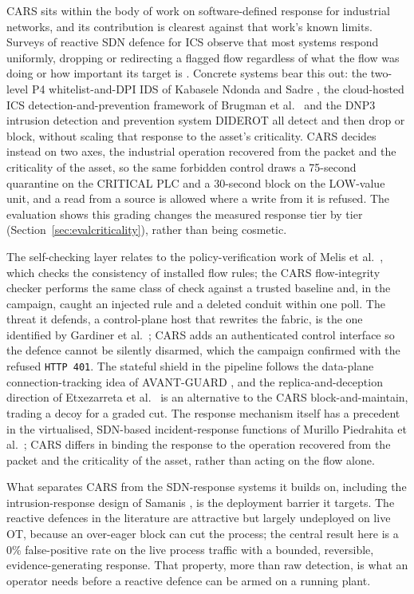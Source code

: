 CARS sits within the body of work on software-defined response for industrial networks, and its contribution is clearest against that work's known limits. Surveys of reactive SDN defence for ICS observe that most systems respond uniformly, dropping or redirecting a flagged flow regardless of what the flow was doing or how important its target is \cite{etxezarreta2023survey}. Concrete systems bear this out: the two-level P4 whitelist-and-DPI IDS of Kabasele Ndonda and Sadre \cite{kabasele2018twolevel}, the cloud-hosted ICS detection-and-prevention framework of Brugman et al.\ \cite{brugman2019cloud} and the DNP3 intrusion detection and prevention system DIDEROT \cite{radoglou2020diderot} all detect and then drop or block, without scaling that response to the asset's criticality. CARS decides instead on two axes, the industrial operation recovered from the packet and the criticality of the asset, so the same forbidden control draws a 75-second quarantine on the CRITICAL PLC and a 30-second block on the LOW-value unit, and a read from a source is allowed where a write from it is refused. The evaluation shows this grading changes the measured response tier by tier (Section~\ref{sec:evalcriticality}), rather than being cosmetic.

The self-checking layer relates to the policy-verification work of Melis et al.\ \cite{melis2018policychecker}, which checks the consistency of installed flow rules; the CARS flow-integrity checker performs the same class of check against a trusted baseline and, in the campaign, caught an injected rule and a deleted conduit within one poll. The threat it defends, a control-plane host that rewrites the fabric, is the one identified by Gardiner et al.\ \cite{gardiner2021controller}; CARS adds an authenticated control interface so the defence cannot be silently disarmed, which the campaign confirmed with the refused \texttt{HTTP 401}. The stateful shield in the pipeline follows the data-plane connection-tracking idea of AVANT-GUARD \cite{shin2013avantguard}, and the replica-and-deception direction of Etxezarreta et al.\ \cite{etxezarreta2026replica} is an alternative to the CARS block-and-maintain, trading a decoy for a graded cut. The response mechanism itself has a precedent in the virtualised, SDN-based incident-response functions of Murillo Piedrahita et al.\ \cite{murillo2018virf}; CARS differs in binding the response to the operation recovered from the packet and the criticality of the asset, rather than acting on the flow alone.

What separates CARS from the SDN-response systems it builds on, including the intrusion-response design of Samanis \cite{samanis2025phd}, is the deployment barrier it targets. The reactive defences in the literature are attractive but largely undeployed on live OT, because an over-eager block can cut the process; the central result here is a 0\% false-positive rate on the live process traffic with a bounded, reversible, evidence-generating response. That property, more than raw detection, is what an operator needs before a reactive defence can be armed on a running plant.

